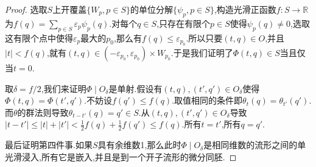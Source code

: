 \begin{enumerate}
\begin{proof}
    	选取$S$上开覆盖$\{W_p,p\in S\}$的单位分解$\{\psi_p,p\in S\}$,构造光滑正函数$f:S\to\mathbb{R}$为$f(q)=\sum_{p\in S}\varepsilon_p\psi_p(q)$.对每个$q\in S$,只存在有限个$p\in S$使得$\psi_p(q)\not=0$,选取这有限个点中使得$\varepsilon_{p}$最大的$p_0$,那么有$f(q)\le\varepsilon_{p_0}$.所以只要$(t,q)\in O$,并且$|t|<f(q)$,就有$(t,q)\in(-\varepsilon_{p_0},\varepsilon_{p_0})\times W_{p_0}$.于是我们证明了$\Phi(t,q)\in S$当且仅当$t=0$.
    	
    	取$\delta=f/2$,我们来证明$\Phi\mid O_{\delta}$是单射.假设有$(t,q),(t',q')\in O_{\delta}$使得$\Phi(t,q)=\Phi(t',q')$.不妨设$f(q')\le f(q)$.取值相同的条件即$\theta_t(q)=\theta_{t'}(q')$.而$\theta$的群法则导致$\theta_{t-t'}(q)=q'\in S$.从$(t,q),(t',q')\in O_{\delta}$导致$|t-t'|\le|t|+|t'|<\frac{1}{2}f(q)+\frac{1}{2}f(q')\le f(q)$.所有$t=t'$,所有$q=q'$.
    	
    	最后证明第四件事.如果$S$具有余维数1,那么此时$\Phi\mid O_{\delta}$是相同维数的流形之间的单光滑浸入,所有它是嵌入,并且是到一个开子流形的微分同胚.
    \end{proof}
\end{enumerate}

